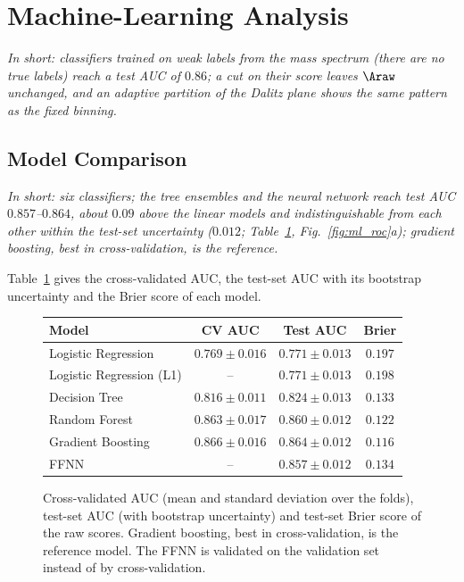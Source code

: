 \FloatBarrier

\section{Machine-Learning Analysis}
\label{sec:ml}
\emph{In short: classifiers trained on weak labels from the mass spectrum (there are no true labels) reach a test AUC of $0.86$; a cut on their score leaves $\Araw$ unchanged, and an adaptive partition of the Dalitz plane shows the same pattern as the fixed binning.}

\subsection{Model Comparison}
\label{sec:ml_models}
\emph{In short: six classifiers; the tree ensembles and the neural network reach test AUC $0.857$--$0.864$, about $0.09$ above the linear models and indistinguishable from each other within the test-set uncertainty ($0.012$; Table~\ref{tab:ml_models}, Fig.~\ref{fig:ml_roc}a); gradient boosting, best in cross-validation, is the reference.}

Table~\ref{tab:ml_models} gives the cross-validated AUC, the test-set AUC with its bootstrap uncertainty and the Brier score of each model.

\begin{figure}[!t]
\makeatletter{}\makeatother
\centering
\begin{tabular}{lccc}
\toprule
Model & CV AUC & Test AUC & Brier \\
\midrule
Logistic Regression       & $0.769 \pm 0.016$ & $0.771 \pm 0.013$ & $0.197$ \\
Logistic Regression (L1)  & --                & $0.771 \pm 0.013$ & $0.198$ \\
Decision Tree             & $0.816 \pm 0.011$ & $0.824 \pm 0.013$ & $0.133$ \\
Random Forest             & $0.863 \pm 0.017$ & $0.860 \pm 0.012$ & $0.122$ \\
Gradient Boosting         & $\mathbf{0.866 \pm 0.016}$ & $0.864 \pm 0.012$ & $0.116$ \\
FFNN                      & --                & $0.857 \pm 0.012$ & $0.134$ \\
\bottomrule
\end{tabular}
\caption{Cross-validated AUC (mean and standard deviation over the folds), test-set AUC (with bootstrap uncertainty) and test-set Brier score of the raw scores. Gradient boosting, best in cross-validation, is the reference model. The FFNN is validated on the validation set instead of by cross-validation.}
\label{tab:ml_models}
\end{figure}

